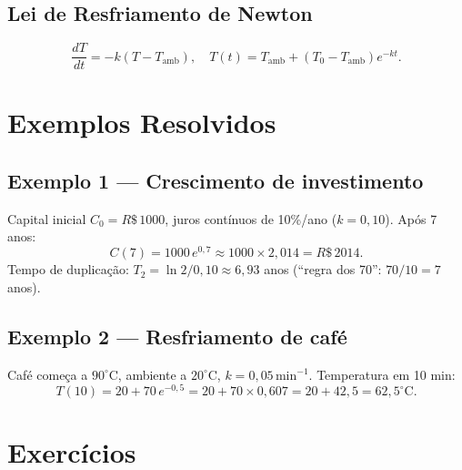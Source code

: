 \documentclass[12pt,a4paper]{article}
\begin{document}
\subsection*{Lei de Resfriamento de Newton}
\[
\frac{dT}{dt} = -k(T - T_\text{amb}), \quad T(t) = T_\text{amb} + (T_0 - T_\text{amb})e^{-kt}.
\]

\section*{Exemplos Resolvidos}

\subsection*{Exemplo 1 --- Crescimento de investimento}
Capital inicial $C_0 = R\$\,1000$, juros cont\'inuos de 10\%/ano ($k=0{,}10$). Ap\'os 7 anos:
\[
C(7) = 1000\,e^{0{,}7} \approx 1000 \times 2{,}014 = R\$\,2014.
\]
Tempo de duplica\c{c}\~ao: $T_2 = \ln 2/0{,}10 \approx 6{,}93$ anos (``regra dos 70'': $70/10 = 7$ anos).

\subsection*{Exemplo 2 --- Resfriamento de caf\'e}
Caf\'e começa a $90^\circ$C, ambiente a $20^\circ$C, $k=0{,}05\,\text{min}^{-1}$. Temperatura em 10 min:
\[
T(10) = 20 + 70\,e^{-0{,}5} = 20 + 70 \times 0{,}607 = 20 + 42{,}5 = 62{,}5^\circ\text{C}.
\]

\section*{Exerc\'icios}
\end{document}
